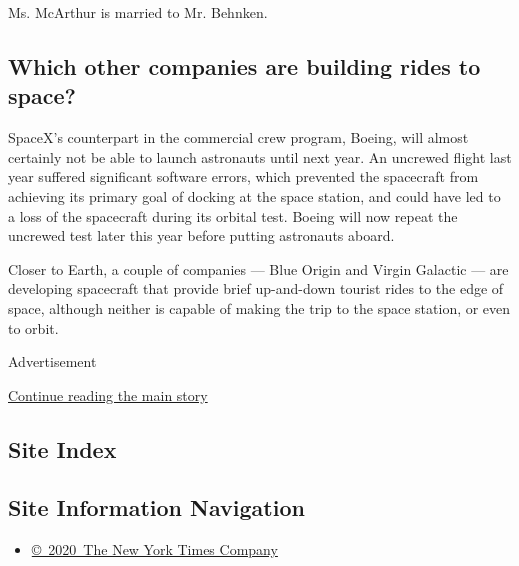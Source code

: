 Ms. McArthur is married to Mr. Behnken.

\hypertarget{which-other-companies-are-building-rides-to-space}{%
\subsection{Which other companies are building rides to
space?}\label{which-other-companies-are-building-rides-to-space}}

SpaceX's counterpart in the commercial crew program, Boeing, will almost
certainly not be able to launch astronauts until next year. An uncrewed
flight last year suffered significant software errors, which prevented
the spacecraft from achieving its primary goal of docking at the space
station, and could have led to a loss of the spacecraft during its
orbital test. Boeing will now repeat the uncrewed test later this year
before putting astronauts aboard.

Closer to Earth, a couple of companies --- Blue Origin and Virgin
Galactic --- are developing spacecraft that provide brief up-and-down
tourist rides to the edge of space, although neither is capable of
making the trip to the space station, or even to orbit.

Advertisement

\protect\hyperlink{after-bottom}{Continue reading the main story}

\hypertarget{site-index}{%
\subsection{Site Index}\label{site-index}}

\hypertarget{site-information-navigation}{%
\subsection{Site Information
Navigation}\label{site-information-navigation}}

\begin{itemize}
\tightlist
\item
  \href{https://help.nytimes.com/hc/en-us/articles/115014792127-Copyright-notice}{©~2020~The
  New York Times Company}
\end{itemize}

